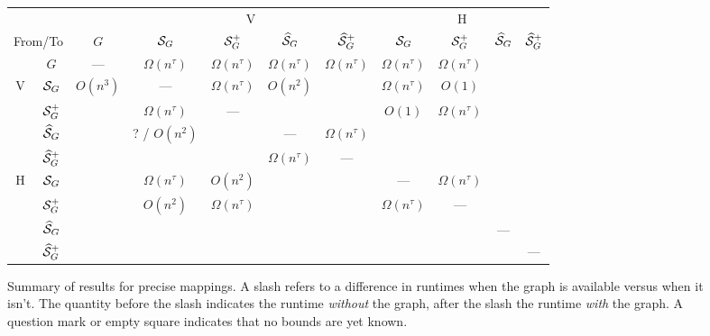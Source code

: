 \begin{figure}
	\centering
	\renewcommand{\arraystretch}{1.5}	\begin{tabular}{|c|c|c|c|c|c|c|c|c|c|c|}
		\hline 
		\multicolumn{3}{|c|}{} & \multicolumn{4}{c|}{\textsf{V}} & \multicolumn{4}{c|}{\textsf{H}}\\
	\cline{3-11} 
\multicolumn{2}{|r|}{From/To} & $G$ & $\mathcal{S}_G$ & $\mathcal{S}_G^+$ & $\widehat{\mathcal{S}}_G$ & $\widehat{\mathcal{S}}_G^+$ & $\mathcal{S}_G$ & $\mathcal{S}_G^+$ & $\widehat{\mathcal{S}}_G$ & $\widehat{\mathcal{S}}_G^+$ \\
\cline{2-11} 
& $G$ & --- &$\Omega(n^\tau)$ &$\Omega(n^\tau)$ &$\Omega(n^\tau)$ &$\Omega(n^\tau)$ & $\Omega(n^\tau)$ & $\Omega(n^\tau)$ &  & \\
\hline 
\multirow{4}{0.4cm}{\textsf{V}} & $\mathcal{S}_G$ & $O(n^3)$ & --- & $\Omega(n^\tau)$ & $O(n^2)$ & & $\Omega(n^\tau)$ & $O(1)$ & & \\
\cline{2-11}
& $\mathcal{S}_G^+$ & & $\Omega(n^\tau)$ & --- & & & $O(1)$ &$\Omega(n^\tau)$ & & \\
\cline{2-11}
& $\widehat{\mathcal{S}}_G$ & & ?  / $O(n^2)$ &  & --- & $\Omega(n^\tau)$ & & & &\\
\cline{2-11}
& $\widehat{\mathcal{S}}_G^+$ & & & &$\Omega(n^\tau)$ & --- & & & & \\
\hline 
\multirow{4}{0.4cm}{\textsf{H}} & $\mathcal{S}_G$ & & $\Omega(n^\tau)$ & $O(n^2)$ & & &--- & $\Omega(n^\tau)$& & \\
\cline{2-11}
& $\mathcal{S}_G^+$ & & $O(n^2)$ & $\Omega(n^\tau)$ & & &$\Omega(n^\tau)$ & --- & & \\
\cline{2-11}
& $\widehat{\mathcal{S}}_G$ & & & & &  & & & --- &\\
\cline{2-11}
& $\widehat{\mathcal{S}}_G^+$ & & & & & & & & & --- \\
\hline 
	\end{tabular}
	\renewcommand{\arraystretch}{1}
\caption{Summary of results for precise mappings. A slash refers to a difference in runtimes when the graph is available versus when it isn't. The quantity before the slash indicates the runtime \emph{without} the graph, after the slash the runtime \emph{with} the graph. A question mark or empty square indicates that no bounds are yet known. }
\label{fig:mapping_results}
\end{figure}

